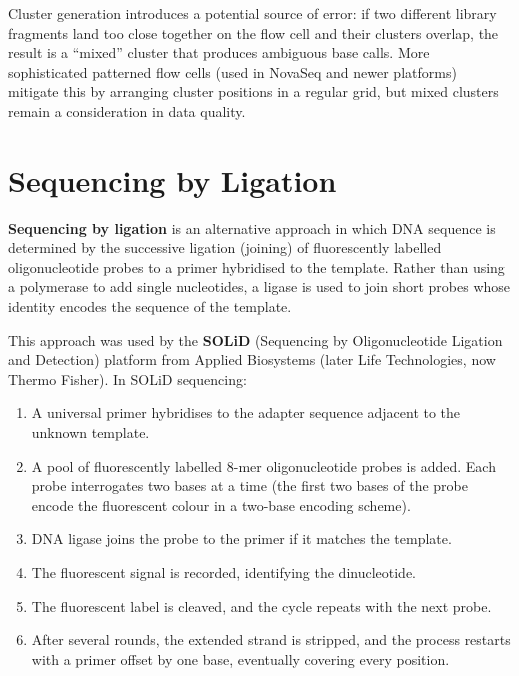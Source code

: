 \begin{warningbox}
Cluster generation introduces a potential source of error: if two different library fragments land too close together on the flow cell and their clusters overlap, the result is a ``mixed'' cluster that produces ambiguous base calls. More sophisticated patterned flow cells (used in NovaSeq and newer platforms) mitigate this by arranging cluster positions in a regular grid, but mixed clusters remain a consideration in data quality.
\end{warningbox}


\section{Sequencing by Ligation}
\label{sec:seqprinciples:sbl}

\textbf{Sequencing by ligation} is an alternative approach in which DNA sequence is determined by the successive ligation (joining) of fluorescently labelled oligonucleotide probes to a primer hybridised to the template. Rather than using a polymerase to add single nucleotides, a ligase is used to join short probes whose identity encodes the sequence of the template.

This approach was used by the \textbf{SOLiD} (Sequencing by Oligonucleotide Ligation and Detection) platform from Applied Biosystems (later Life Technologies, now Thermo Fisher). In SOLiD sequencing:

\begin{enumerate}[itemsep=2pt]
  \item A universal primer hybridises to the adapter sequence adjacent to the unknown template.
  \item A pool of fluorescently labelled 8-mer oligonucleotide probes is added. Each probe interrogates two bases at a time (the first two bases of the probe encode the fluorescent colour in a two-base encoding scheme).
  \item DNA ligase joins the probe to the primer if it matches the template.
  \item The fluorescent signal is recorded, identifying the dinucleotide.
  \item The fluorescent label is cleaved, and the cycle repeats with the next probe.
  \item After several rounds, the extended strand is stripped, and the process restarts with a primer offset by one base, eventually covering every position.
\end{enumerate}

